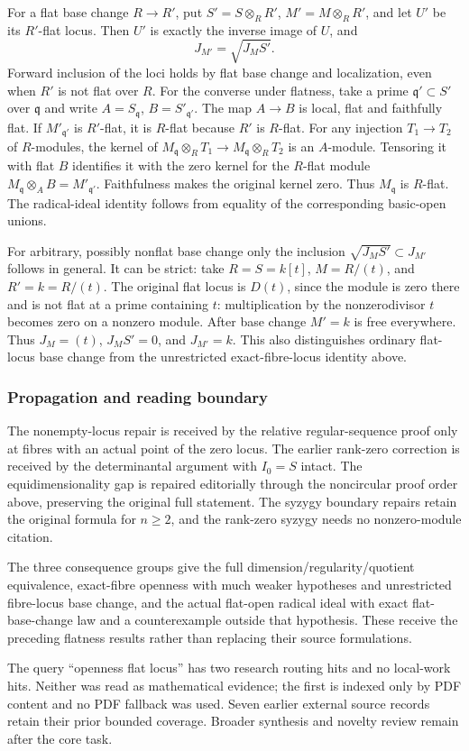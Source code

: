 For a flat base change \(R\to R'\), put \(S'=S\otimes_R R'\), \(M'=M\otimes_R R'\), and let \(U'\) be its \(R'\)-flat locus. Then \(U'\) is exactly the inverse image of \(U\), and \[
J_{M'}=\sqrt{J_M S'}.
\] Forward inclusion of the loci holds by flat base change and localization, even when \(R'\) is not flat over \(R\). For the converse under flatness, take a prime \(\mathfrak q'\subset S'\) over \(\mathfrak q\) and write \(A=S_{\mathfrak q}\), \(B=S'_{\mathfrak q'}\). The map \(A\to B\) is local, flat and faithfully flat. If \(M'_{\mathfrak q'}\) is \(R'\)-flat, it is \(R\)-flat because \(R'\) is \(R\)-flat. For any injection \(T_1\to T_2\) of \(R\)-modules, the kernel of \(M_{\mathfrak q}\otimes_R T_1\to M_{\mathfrak q}\otimes_R T_2\) is an \(A\)-module. Tensoring it with flat \(B\) identifies it with the zero kernel for the \(R\)-flat module \(M_{\mathfrak q}\otimes_A B=M'_{\mathfrak q'}\). Faithfulness makes the original kernel zero. Thus \(M_{\mathfrak q}\) is \(R\)-flat. The radical-ideal identity follows from equality of the corresponding basic-open unions.

For arbitrary, possibly nonflat base change only the inclusion \(\sqrt{J_M S'}\subset J_{M'}\) follows in general. It can be strict: take \(R=S=k[t]\), \(M=R/(t)\), and \(R'=k=R/(t)\). The original flat locus is \(D(t)\), since the module is zero there and is not flat at a prime containing \(t\): multiplication by the nonzerodivisor \(t\) becomes zero on a nonzero module. After base change \(M'=k\) is free everywhere. Thus \(J_M=(t)\), \(J_MS'=0\), and \(J_{M'}=k\). This also distinguishes ordinary flat-locus base change from the unrestricted exact-fibre-locus identity above.

\subsubsection{Propagation and reading boundary}\label{algebra-proof-039-propagation-and-reading-boundary}

The nonempty-locus repair is received by the relative regular-sequence proof only at fibres with an actual point of the zero locus. The earlier rank-zero correction is received by the determinantal argument with \(I_0=S\) intact. The equidimensionality gap is repaired editorially through the noncircular proof order above, preserving the original full statement. The syzygy boundary repairs retain the original formula for \(n\geq2\), and the rank-zero syzygy needs no nonzero-module citation.

The three consequence groups give the full dimension/regularity/quotient equivalence, exact-fibre openness with much weaker hypotheses and unrestricted fibre-locus base change, and the actual flat-open radical ideal with exact flat-base-change law and a counterexample outside that hypothesis. These receive the preceding flatness results rather than replacing their source formulations.

The query ``openness flat locus'' has two research routing hits and no local-work hits. Neither was read as mathematical evidence; the first is indexed only by PDF content and no PDF fallback was used. Seven earlier external source records retain their prior bounded coverage. Broader synthesis and novelty review remain after the core task.
